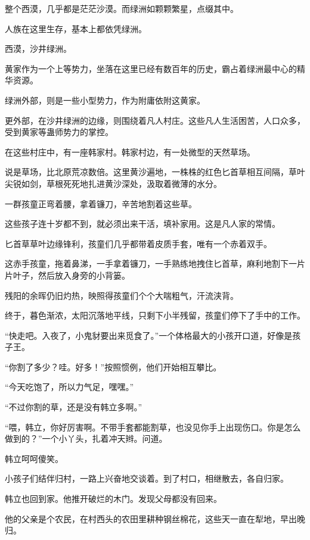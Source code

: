 
\begin{this_body}

整个西漠，几乎都是茫茫沙漠。而绿洲如颗颗繁星，点缀其中。

人族在这里生存，基本上都依凭绿洲。

西漠，沙井绿洲。

黄家作为一个上等势力，坐落在这里已经有数百年的历史，霸占着绿洲最中心的精华资源。

绿洲外部，则是一些小型势力，作为附庸依附这黄家。

更外部，在沙井绿洲的边缘，则围绕着凡人村庄。这些凡人生活困苦，人口众多，受到黄家等蛊师势力的掌控。

在这些村庄中，有一座韩家村。韩家村边，有一处微型的天然草场。

说是草场，比北原荒凉数倍。这里黄沙遍地，一株株的红色匕首草相互间隔，草叶尖锐如剑，草根死死地扎进黄沙深处，汲取着微薄的水分。

一群孩童正弯着腰，拿着镰刀，辛苦地割着这些草。

这些孩子连十岁都不到，就必须出来干活，填补家用。这是凡人家的常情。

匕首草草叶边缘锋利，孩童们几乎都带着皮质手套，唯有一个赤着双手。

这赤手孩童，拖着鼻涕，一手拿着镰刀，一手熟练地拽住匕首草，麻利地割下一片片叶子，然后放入身旁的小背篓。

残阳的余晖仍旧灼热，映照得孩童们个个大喘粗气，汗流浃背。

终于，暮色渐浓，太阳沉落地平线，只剩下小半残留，孩童们停下了手中的工作。

“快走吧。入夜了，小鬼豺要出来觅食了。”一个体格最大的小孩开口道，好像是孩子王。

“你割了多少？哇。好多！”按照惯例，他们开始相互攀比。

“今天吃饱了，所以力气足，嘿嘿。”

“不过你割的草，还是没有韩立多啊。”

“喂，韩立，你好厉害啊。不带手套都能割草，也没见你手上出现伤口。你是怎么做到的？”一个小丫头，扎着冲天辫。问道。

韩立呵呵傻笑。

小孩子们结伴归村，一路上兴奋地交谈着。到了村口，相继散去，各自归家。

韩立也回到家。他推开破烂的木门。发现父母都没有回来。

他的父亲是个农民，在村西头的农田里耕种钢丝棉花，这些天一直在犁地，早出晚归。


\end{this_body}
